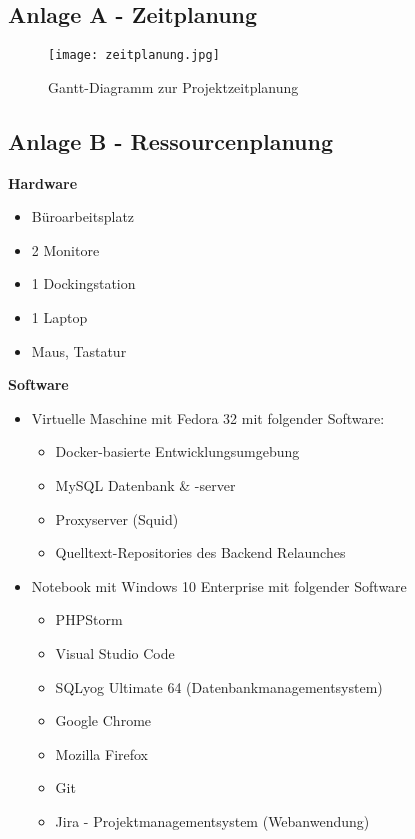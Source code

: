 \subsection{Anlage A - Zeitplanung}
\label{anlage:zeitplanung}

\begin{figure}[h]
    \centering
    \texttt{[image: zeitplanung.jpg]}
    \caption{Gantt-Diagramm zur Projektzeitplanung}
\end{figure}

\pagebreak
\subsection{Anlage B - Ressourcenplanung}
\label{anlage:ressourcen}

{\textbf{Hardware}}
    \begin{itemize}
        \item Büroarbeitsplatz
        \item 2 Monitore
        \item 1 Dockingstation
        \item 1 Laptop
        \item Maus, Tastatur
    \end{itemize}

{\textbf{Software}}
    \begin{itemize}
        \item Virtuelle Maschine mit Fedora 32 mit folgender Software:
        \begin{itemize}
            \item Docker-basierte Entwicklungsumgebung
            \item MySQL Datenbank \& -server
            \item Proxyserver (Squid)
            \item Quelltext-Repositories des Backend Relaunches
        \end{itemize}
        \item Notebook mit Windows 10 Enterprise mit folgender Software
        \begin{itemize}
            \item PHPStorm
            \item Visual Studio Code
            \item SQLyog Ultimate 64 (Datenbankmanagementsystem)
            \item Google Chrome
            \item Mozilla Firefox
            \item Git
            \item Jira - Projektmanagementsystem (Webanwendung)
        \end{itemize}
    \end{itemize}

